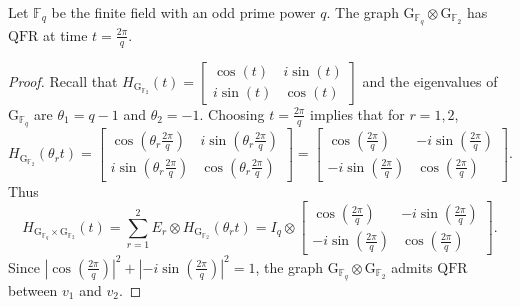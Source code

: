 \documentclass[10pt,a4paper]{amsart}
\newcommand{\G}{\mathrm{G}}
\newcommand{\QFR}{\mathrm{QFR}}
\begin{document}
\begin{thm} \label{QFR finite com ring}
     Let $\mathbb{F}_q$ be the finite field with an odd prime power $q$. The graph $\G_{\mathbb{F}_q} \otimes \G_{\mathbb{F}_2}$ has $\QFR$ at time $t = \frac{2\pi}{q}$.
\end{thm} 

\begin{proof}
  Recall that $H_{\G_{\mathbb{F}_2}}(t) = 
  \begin{bmatrix}
      \cos({t}) & i \sin({t}) \\
      i \sin({t}) & \cos({t})
  \end{bmatrix}$ and the eigenvalues of $\G_{\mathbb{F}_q}$ are $\theta_1 = q - 1$ and $\theta_2 = -1$. Choosing $t = \frac{2\pi}{q}$ implies that for $r = 1, 2$,
  $$
  H_{\G_{\mathbb{F}_2}}(\theta_r t) = 
  \begin{bmatrix}
      \cos(\theta_r \frac{2\pi}{q}) & i \sin(\theta_r \frac{2\pi}{q}) \\
      i \sin(\theta_r \frac{2\pi}{q}) & \cos(\theta_r \frac{2\pi}{q}) 
  \end{bmatrix}
  =
  \begin{bmatrix}
      \cos(\frac{2\pi}{q}) & -i \sin( \frac{2\pi}{q}) \\
      -i \sin( \frac{2\pi}{q}) & \cos(\frac{2\pi}{q}) 
  \end{bmatrix}.
  $$
    Thus 
    \[
H_{\G_{\mathbb{F}_q} \times \G_{\mathbb{F}_2}}(t) = \sum_{r = 1}^2 E_r \otimes H_{\G_{\mathbb{F}_2}}(\theta_r t) = I_q \otimes \begin{bmatrix}
      \cos(\frac{2\pi}{q}) & -i \sin( \frac{2\pi}{q}) \\
      -i \sin( \frac{2\pi}{q}) & \cos(\frac{2\pi}{q}) 
  \end{bmatrix}. 
\]
Since $|\cos(\frac{2\pi}{q})|^2 + |-i \sin( \frac{2\pi}{q})|^2 = 1$, the graph $\G_{\mathbb{F}_q} \otimes \G_{\mathbb{F}_2}$ admits $\QFR$ between $v_1$ and $v_2$.
\end{proof}
\end{document}
